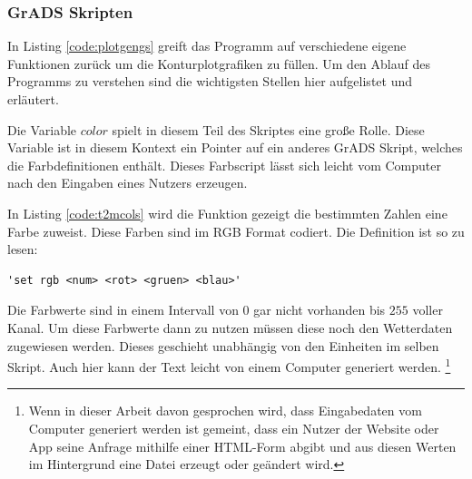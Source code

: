 \subsubsection*{GrADS Skripten}


In Listing \ref{code:plotgengs} greift das Programm auf verschiedene eigene
Funktionen zurück um die Konturplotgrafiken zu füllen.
Um den Ablauf des Programms zu verstehen sind
die wichtigsten Stellen hier aufgelistet und erläutert.

Die Variable $color$ spielt in diesem Teil des Skriptes eine große Rolle.
Diese Variable ist in diesem Kontext ein Pointer auf ein anderes GrADS Skript,
welches die Farbdefinitionen enthält.
Dieses Farbscript lässt sich leicht vom Computer nach den Eingaben eines Nutzers erzeugen.

In Listing \ref{code:t2mcols} wird die Funktion gezeigt die bestimmten Zahlen eine Farbe zuweist.
Diese Farben sind im RGB Format codiert.
Die Definition ist so zu lesen:

\begin{lstlisting}[language=grads]
	'set rgb <num> <rot> <gruen> <blau>'
\end{lstlisting}

Die Farbwerte sind in einem Intervall von $0$ gar nicht vorhanden bis $255$ voller Kanal.
Um diese Farbwerte dann zu nutzen müssen diese noch den Wetterdaten zugewiesen werden.
Dieses geschieht unabhängig von den Einheiten im selben Skript.
Auch hier kann der Text leicht von einem Computer generiert werden.
\footnote{Wenn in dieser Arbeit davon gesprochen wird, dass Eingabedaten vom Computer
generiert werden ist gemeint,
dass ein Nutzer der Website oder App seine Anfrage mithilfe einer HTML-Form abgibt
und aus diesen Werten im Hintergrund eine Datei erzeugt oder geändert wird.}


